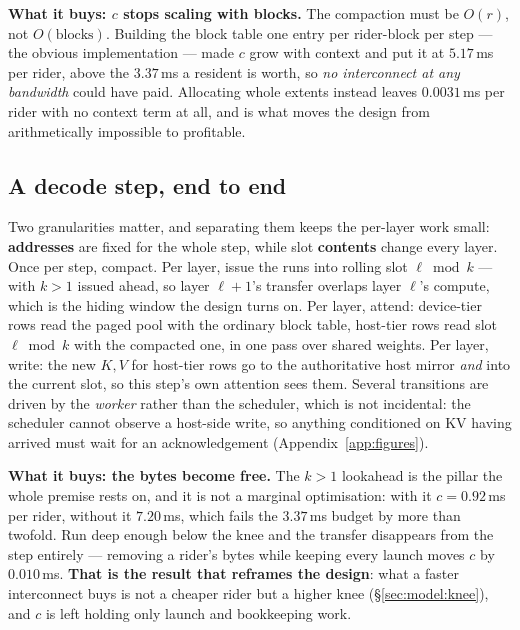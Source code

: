 \textbf{What it buys: $c$ stops scaling with blocks.} The compaction must be
$O(r)$, not $O(\text{blocks})$. Building the block table one entry per rider-block
per step --- the obvious implementation --- made $c$ grow with context and put it
at $5.17$\,ms per rider, above the $3.37$\,ms a resident is worth, so \emph{no
interconnect at any bandwidth} could have paid. Allocating whole extents instead
leaves $0.0031$\,ms per rider with no context term at all, and is what moves the
design from arithmetically impossible to profitable.

\subsection{A decode step, end to end}
\label{sec:design:step}



Two granularities matter, and separating them keeps the per-layer work small:
\textbf{addresses} are fixed for the whole step, while slot \textbf{contents} change
every layer. Once per step, compact. Per layer, issue the runs into rolling slot
$\ell \bmod k$ --- with $k>1$ issued ahead, so layer $\ell{+}1$'s transfer overlaps
layer $\ell$'s compute, which is the hiding window the design turns on. Per layer,
attend: device-tier rows read the paged pool with the ordinary block table,
host-tier rows read slot $\ell \bmod k$ with the compacted one, in one pass over
shared weights. Per layer, write: the new $K,V$ for host-tier rows go to the
authoritative host mirror \emph{and} into the current slot, so this step's own
attention sees them. Several transitions are driven by the \emph{worker} rather than
the scheduler, which is not incidental: the scheduler cannot observe a host-side
write, so anything conditioned on KV having arrived must wait for an acknowledgement
(Appendix~\ref{app:figures}).

\textbf{What it buys: the bytes become free.} The $k>1$ lookahead is the pillar the
whole premise rests on, and it is not a marginal optimisation: with it $c = 0.92$\,ms
per rider, without it $7.20$\,ms, which fails the $3.37$\,ms budget by more than
twofold. Run deep enough below the knee and the transfer disappears from the step
entirely --- removing a rider's bytes while keeping every launch moves $c$ by
$0.010$\,ms. \textbf{That is the result that reframes the design}: what a faster
interconnect buys is not a cheaper rider but a higher knee
(\S\ref{sec:model:knee}), and $c$ is left holding only launch and bookkeeping work.

